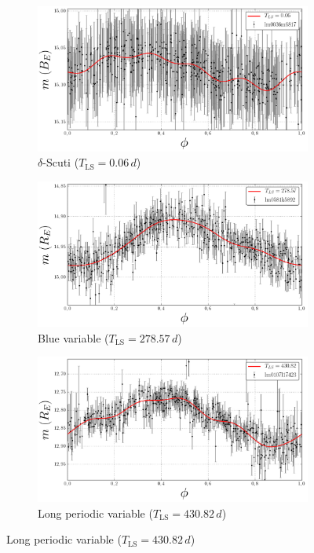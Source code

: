 \begin{figure}[H]
\begin{subfigure}[t]{0.49\textwidth}
	\end{subfigure}
	\begin{subfigure}[t]{0.49\textwidth}
		\centering
		\caption{$\delta$-Scuti ($T_{\text{LS}} = 0.06 \, \unit{d}$)}
		\label{fig:lightcurve-dsct}
		\includegraphics[width=\textwidth]{figures/lightcurves/dsct.png}		
	\end{subfigure}
	\begin{subfigure}[t]{0.49\textwidth}
		\centering
		\caption{Blue variable ($T_{\text{LS}} = 278.57 \, \unit{d}$)}
		\label{fig:lightcurve-bv}
		\includegraphics[width=\textwidth]{figures/lightcurves/bv.png}		
	\end{subfigure}
	\begin{subfigure}[t]{0.49\textwidth}
		\centering
		\caption{Long periodic variable ($T_{\text{LS}} = 430.82 \, \unit{d}$)}
		\label{fig:lightcurve-lpv}
		\includegraphics[width=\textwidth]{figures/lightcurves/lpv.png}		

\end{subfigure}
\end{figure}
